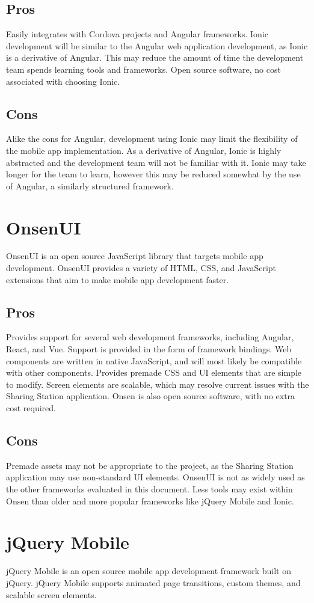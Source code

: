 \documentclass[letterpaper,10pt,draftclsnofoot,onecolumn]{IEEEtran}
\begin{document}
\subsection*{Pros}
Easily integrates with Cordova projects and Angular frameworks.
Ionic development will be similar to the Angular web application development, as Ionic is a derivative of Angular. This may reduce the amount of time the development team spends learning tools and frameworks.
Open source software, no cost associated with choosing Ionic.
\subsection*{Cons}
Alike the cons for Angular, development using Ionic may limit the flexibility of the mobile app implementation.
As a derivative of Angular, Ionic is highly abstracted and the development team will not be familiar with it. Ionic may take longer for the team to learn, however this may be reduced somewhat by the use of Angular, a similarly structured framework.
\section*{OnsenUI}
OnsenUI is an open source JavaScript library that targets mobile app development. OnsenUI provides a variety of HTML, CSS, and JavaScript extensions that aim to make mobile app development faster.
\subsection*{Pros}
Provides support for several web development frameworks, including Angular, React, and Vue. Support is provided in the form of framework bindings.
Web components are written in native JavaScript, and will most likely be compatible with other components.
Provides premade CSS and UI elements that are simple to modify. Screen elements are scalable, which may resolve current issues with the Sharing Station application.
Onsen is also open source software, with no extra cost required.
\subsection*{Cons}
Premade assets may not be appropriate to the project, as the Sharing Station application may use non-standard UI elements.
OnsenUI is not as widely used as the other frameworks evaluated in this document. Less tools may exist within Onsen than older and more popular frameworks like jQuery Mobile and Ionic.
\section*{jQuery Mobile}
jQuery Mobile is an open source mobile app development framework built on jQuery. jQuery Mobile supports animated page transitions, custom themes, and scalable screen elements.
\end{document}
